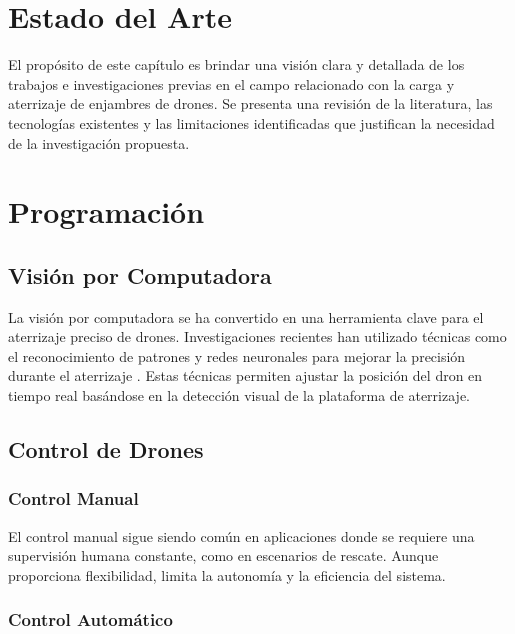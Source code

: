 
\section{Estado del Arte}

El propósito de este capítulo es brindar una visión clara y detallada de los trabajos e investigaciones previas en el campo relacionado con la carga y aterrizaje de enjambres de drones. Se presenta una revisión de la literatura, las tecnologías existentes y las limitaciones identificadas que justifican la necesidad de la investigación propuesta.

\section{Programación}

\subsection{Visión por Computadora}

La visión por computadora se ha convertido en una herramienta clave para el aterrizaje preciso de drones. Investigaciones recientes han utilizado técnicas como el reconocimiento de patrones y redes neuronales para mejorar la precisión durante el aterrizaje \cite{Smith2020}. Estas técnicas permiten ajustar la posición del dron en tiempo real basándose en la detección visual de la plataforma de aterrizaje.

\subsection{Control de Drones}

\subsubsection{Control Manual}

El control manual sigue siendo común en aplicaciones donde se requiere una supervisión humana constante, como en escenarios de rescate. Aunque proporciona flexibilidad, limita la autonomía y la eficiencia del sistema.

\subsubsection{Control Automático}


